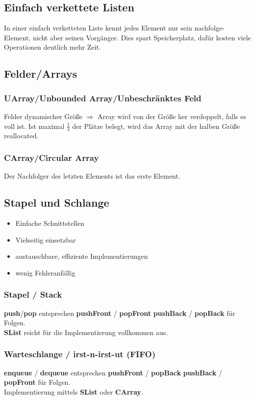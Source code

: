 \subsection{Einfach verkettete Listen}
In einer einfach verketteten Liste kennt jedes Element nur sein nachfolge-Element, nicht aber seinen Vorgänger. Dies spart Speicherplatz, dafür kosten viele Operationen deutlich mehr Zeit.

\subsection{Felder/Arrays}
\subsubsection{UArray/Unbounded Array/Unbeschränktes Feld}
Felder dynamischer Größe $\Rightarrow$ Array wird von der Größe her verdoppelt, falls es voll ist. Ist maximal $\frac{1}{4}$ der Plätze belegt, wird das Array mit der halben Größe reallocated.

\subsubsection{CArray/Circular Array}
Der Nachfolger des letzten Elements ist das erste Element.


\subsection{Stapel und Schlange}
\begin{itemize}
    \item Einfache Schnittstellen
    \item Vielseitig einsetzbar
    \item austauschbare, effiziente Implementierungen
    \item wenig Fehleranfällig
\end{itemize}

\subsubsection{Stapel / Stack}
\textbf{push}/\textbf{pop} entsprechen  \textbf{pushFront} / \textbf{popFront}  \textbf{pushBack} / \textbf{popBack} für Folgen.\\
\textbf{SList} reicht für die Implementierung vollkommen aus.

\subsubsection{Warteschlange / irst-n-irst-ut (FIFO)}
\textbf{enqueue} / \textbf{dequeue} entsprechen  \textbf{pushFront} / \textbf{popBack}  \textbf{pushBack} / \textbf{popFront} für Folgen.\\
Implementierung mittels \textbf{SList} oder \textbf{CArray}.

